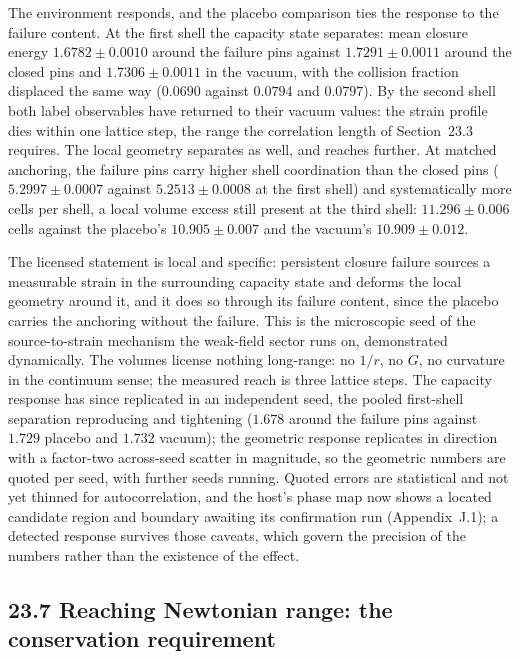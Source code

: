 \documentclass[11pt]{article}
\begin{document}
The environment responds, and the placebo comparison ties the response to the failure content. At the first shell the capacity state separates: mean closure energy $1.6782\pm0.0010$ around the failure pins against $1.7291\pm0.0011$ around the closed pins and $1.7306\pm0.0011$ in the vacuum, with the collision fraction displaced the same way ($0.0690$ against $0.0794$ and $0.0797$). By the second shell both label observables have returned to their vacuum values: the strain profile dies within one lattice step, the range the correlation length of Section~23.3 requires. The local geometry separates as well, and reaches further. At matched anchoring, the failure pins carry higher shell coordination than the closed pins ($5.2997\pm0.0007$ against $5.2513\pm0.0008$ at the first shell) and systematically more cells per shell, a local volume excess still present at the third shell: $11.296\pm0.006$ cells against the placebo's $10.905\pm0.007$ and the vacuum's $10.909\pm0.012$.

The licensed statement is local and specific: persistent closure failure sources a measurable strain in the surrounding capacity state and deforms the local geometry around it, and it does so through its failure content, since the placebo carries the anchoring without the failure. This is the microscopic seed of the source-to-strain mechanism the weak-field sector runs on, demonstrated dynamically. The volumes license nothing long-range: no $1/r$, no $G$, no curvature in the continuum sense; the measured reach is three lattice steps. The capacity response has since replicated in an independent seed, the pooled first-shell separation reproducing and tightening ($1.678$ around the failure pins against $1.729$ placebo and $1.732$ vacuum); the geometric response replicates in direction with a factor-two across-seed scatter in magnitude, so the geometric numbers are quoted per seed, with further seeds running. Quoted errors are statistical and not yet thinned for autocorrelation, and the host's phase map now shows a located candidate region and boundary awaiting its confirmation run (Appendix~J.1); a detected response survives those caveats, which govern the precision of the numbers rather than the existence of the effect.

\subsection{23.7 Reaching Newtonian range: the conservation requirement}
\end{document}
